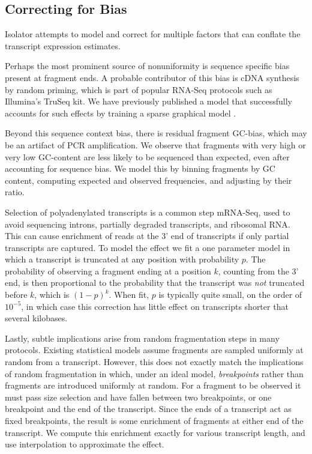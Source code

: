 \documentclass[twocolumn]{article}
\begin{document}
\subsection{Correcting for Bias}\label{correcting-for-bias}

Isolator attempts to model and correct for multiple factors that can
conflate the transcript expression estimates.

Perhaps the most prominent source of nonuniformity is sequence specific bias
present at fragment ends. A probable contributor of this bias is cDNA synthesis
by random priming, which is part of popular RNA-Seq protocols such as Illumina's
TruSeq kit. We have previously published a model that successfully accounts for
such effects by training a sparse graphical model \cite{Jones:2012hg}.

Beyond this sequence context bias, there is residual fragment GC-bias,
which may be an artifact of PCR amplification. We observe that fragments
with very high or very low GC-content are less likely to be sequenced
than expected, even after accounting for sequence bias. We model this by
binning fragments by GC content, computing expected and observed
frequencies, and adjusting by their ratio.

Selection of polyadenylated transcripts is a common step mRNA-Seq, used to avoid
sequencing introns, partially degraded transcripts, and ribosomal RNA. This can
cause enrichment of reads at the 3' end of transcripts if only partial
transcripts are captured. To model the effect we fit a one parameter model in
which a transcript is truncated at any position with probability $p$. The
probability of observing a fragment ending at a position $k$, counting from the
3' end, is then proportional to the probability that the transcript was
\emph{not} truncated before $k$, which is $(1-p)^{k}$.  When fit, $p$ is
typically quite small, on the order of $10^{-5}$, in which case this correction
has little effect on transcripts shorter that several kilobases.

Lastly, subtle implications arise from random fragmentation steps in many
protocols. Existing statistical models assume fragments are sampled uniformly
at random from a transcript. However, this does not exactly match the
implications of random fragmentation in which, under an ideal model,
\emph{breakpoints} rather than fragments are introduced uniformly at random. For
a fragment to be observed it must pass size selection and have fallen between
two breakpoints, or one breakpoint and the end of the transcript. Since the ends
of a transcript act as fixed breakpoints, the result is some enrichment of
fragments at either end of the transcript. We compute this enrichment exactly
for various transcript length, and use interpolation to approximate the effect.



\end{document}
